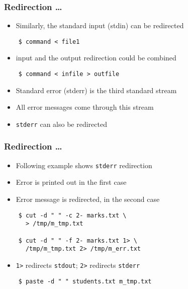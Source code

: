 \documentclass[12pt,compress]{beamer}
\begin{document}
\begin{frame}[fragile]
  \frametitle{Redirection \ldots} 
  \begin{itemize}
  \item Similarly, the standard input (stdin) can be redirected
  \end{itemize}
  \begin{lstlisting}
    $ command < file1
  \end{lstlisting} %
  \begin{itemize}
  \item input and the output redirection could be combined
  \end{itemize}
  \begin{lstlisting}
    $ command < infile > outfile
  \end{lstlisting} %
  \begin{itemize}
  \item Standard error (stderr) is the third standard stream
  \item All error messages come through this stream
  \item \texttt{stderr} can also be redirected
  \end{itemize}
\end{frame}

\begin{frame}[fragile]
  \frametitle{Redirection \ldots} 
  \begin{itemize}
  \item Following example shows \texttt{stderr} redirection
  \item Error is printed out in the first case
  \item Error message is redirected, in the second case
  \end{itemize}
  \begin{lstlisting}
    $ cut -d " " -c 2- marks.txt \
      > /tmp/m_tmp.txt

    $ cut -d " " -f 2- marks.txt 1> \
      /tmp/m_tmp.txt 2> /tmp/m_err.txt
  \end{lstlisting} %
  \begin{itemize}
  \item \texttt{1>} redirects \texttt{stdout}; \texttt{2>} redirects
    \texttt{stderr} 
  \end{itemize}
  \begin{lstlisting}
    $ paste -d " " students.txt m_tmp.txt
  \end{lstlisting} %
\end{frame}
\end{document}
